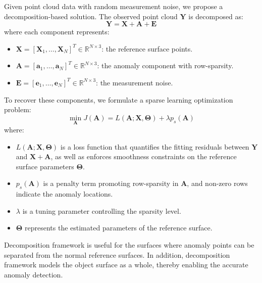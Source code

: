 Given point cloud data with random measurement noise, we propose a decomposition-based solution. The observed point cloud \(\mathbf{Y}\) is decomposed as:
\begin{equation}
    \mathbf{Y} = \mathbf{X} + \mathbf{A} + \mathbf{E}
\end{equation}
where each component represents:
\begin{itemize}[itemsep=1pt]
    \item \(\mathbf{X} = [\mathbf{X}_1,\ldots,\mathbf{X}_N]^T \in \mathbb{R}^{N \times 3}\): the reference surface points.
    \item \(\mathbf{A} = [\mathbf{a}_1,\ldots,\mathbf{a}_N]^T \in \mathbb{R}^{N \times 3}\): the anomaly component with row-sparsity.
    \item \(\mathbf{E} = [\mathbf{e}_1,\ldots,\mathbf{e}_N]^T \in \mathbb{R}^{N \times 3}\): the measurement noise.
\end{itemize}
To recover these components, we formulate a sparse learning optimization problem:
\begin{equation}
    \min_{\mathbf{A}} J(\mathbf{A}) = L(\mathbf{A}; \mathbf{X}, \mathbf{\Theta}) + \lambda p_s(\mathbf{A})
    \label{eq:optimization}
\end{equation}
where:
\begin{itemize}[itemsep=1pt]
    \item \(L(\mathbf{A}; \mathbf{X}, \mathbf{\Theta})\) is a loss function that quantifies the fitting residuals between \(\mathbf{Y}\) and \(\mathbf{X} + \mathbf{A}\), as well as enforces smoothness constraints on the reference surface parameters \(\mathbf{\Theta}\).
    \item \(p_s(\mathbf{A})\) is a penalty term promoting row-sparsity in \(\mathbf{A}\), and non-zero rows indicate the anomaly locations.
    \item \(\lambda\) is a tuning parameter controlling the sparsity level.
    \item \(\mathbf{\Theta}\) represents the estimated parameters of the reference surface.
\end{itemize}

Decomposition framework is useful for the surfaces where anomaly points can be separated from the normal reference surfaces. In addition, decomposition framework models the object surface as a whole, thereby enabling the accurate anomaly detection.  


